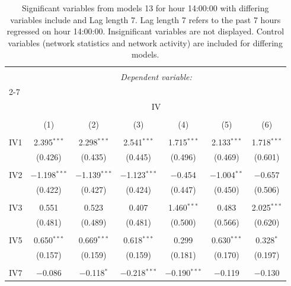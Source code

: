 
\begin{table}[!htbp] \centering 
  \caption{Significant variables from models 13 for hour 14:00:00 with differing variables include 
                               and Lag length 7. Lag length 7 refers to the past 7 hours regressed on hour 14:00:00. 
                               Insignificant variables are not displayed. 
                               Control variables (network statistics and network activity) are 
                               included for differing models.} 
  \label{IVmodels1_t_hourlagged1} 
\scriptsize 
\begin{tabular}{@{\extracolsep{5pt}}lcccccc} 
\\[-1.8ex]\hline 
\hline \\[-1.8ex] 
 & \multicolumn{6}{c}{\textit{Dependent variable:}} \\ 
\cline{2-7} 
\\[-1.8ex] & \multicolumn{6}{c}{IV} \\ 
\\[-1.8ex] & (1) & (2) & (3) & (4) & (5) & (6)\\ 
\hline \\[-1.8ex] 
 IV1 & 2.395$^{***}$ & 2.298$^{***}$ & 2.541$^{***}$ & 1.715$^{***}$ & 2.133$^{***}$ & 1.718$^{***}$ \\ 
  & (0.426) & (0.435) & (0.445) & (0.496) & (0.469) & (0.601) \\ 
  & & & & & & \\ 
 IV2 & $-$1.198$^{***}$ & $-$1.139$^{***}$ & $-$1.123$^{***}$ & $-$0.454 & $-$1.004$^{**}$ & $-$0.657 \\ 
  & (0.422) & (0.427) & (0.424) & (0.447) & (0.450) & (0.506) \\ 
  & & & & & & \\ 
 IV3 & 0.551 & 0.523 & 0.407 & 1.460$^{***}$ & 0.483 & 2.025$^{***}$ \\ 
  & (0.481) & (0.489) & (0.481) & (0.500) & (0.566) & (0.620) \\ 
  & & & & & & \\ 
 IV5 & 0.650$^{***}$ & 0.669$^{***}$ & 0.618$^{***}$ & 0.299 & 0.630$^{***}$ & 0.328$^{*}$ \\ 
  & (0.157) & (0.159) & (0.159) & (0.181) & (0.170) & (0.197) \\ 
  & & & & & & \\ 
 IV7 & $-$0.086 & $-$0.118$^{*}$ & $-$0.218$^{***}$ & $-$0.190$^{***}$ & $-$0.119 & $-$0.130 \\ 

\end{tabular}
\end{table}
